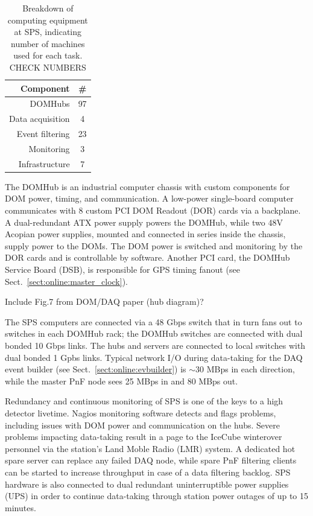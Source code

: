 \begin{table}[h]
  \centering
  \begin{tabular}{ r | c }
    \bf{Component} & \bf{\#} \\
    \hline
    DOMHubs & 97 \\
    Data acquisition & 4 \\   
    Event filtering & 23 \\
    Monitoring & 3 \\
    Infrastructure & 7 \\
  \end{tabular}
  \caption{Breakdown of computing equipment at SPS, indicating number of
    machines used for each task. CHECK NUMBERS} 
  \label{tab:sps_breakdown}
\end{table}

The DOMHub is an industrial computer chassis with custom components for
DOM power, timing, and communication.  A low-power single-board computer
communicates with 8 custom PCI DOM Readout (DOR) cards via a backplane.  A
dual-redundant ATX power supply powers the DOMHub, while two 48V Acopian
power supplies, mounted and connected in series inside the chassis, supply
power to the DOMs.  The DOM power is switched and monitoring by the DOR
cards and is controllable by software.  Another PCI card, the DOMHub
Service Board (DSB), is responsible for GPS timing fanout (see
Sect.~\ref{sect:online:master_clock}).

Include Fig.7 from DOM/DAQ paper (hub diagram)?

The SPS computers are connected via a 48 Gbps switch that in turn fans out
to switches in each DOMHub rack; the DOMHub switches are connected with
dual bonded 10 Gbps links.  The hubs and servers are connected to local
switches with dual bonded 1 Gpbs links.  Typical network I/O during data-taking for the
DAQ event builder (see Sect.~\ref{sect:online:evbuilder}) is $\sim30$ MBps in each
direction, while the master PnF node sees 25 MBps in and 80 MBps out.

Redundancy and continuous monitoring of SPS is one of the keys to a high
detector livetime.  Nagios monitoring software detects and flags problems,
including issues with DOM power and communication on the hubs.  Severe
problems impacting data-taking result in a page to the IceCube
winterover personnel via the station's Land Moble Radio (LMR) system. 
A dedicated hot spare server can replace any failed DAQ
node, while spare PnF filtering clients can be started to increase
throughput in case of a data filtering backlog.  SPS hardware is also
connected to dual redundant uninterruptible power supplies 
(UPS) in order to continue data-taking through station power outages of up
to 15 minutes.  

